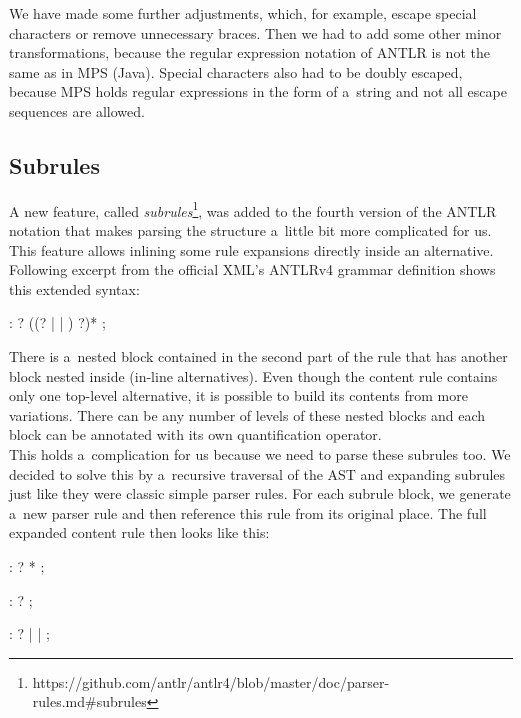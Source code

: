 We have made some further adjustments, which, for example, escape special characters or remove unnecessary braces.
Then we had to add some other minor transformations, because the regular expression notation of ANTLR is not the same as in MPS (Java).
Special characters also had to be doubly escaped, because MPS holds regular expressions in the form of a~string and not all escape sequences are allowed.

\subsection{Subrules}
\label{chap:subrules}

A new feature, called \textit{subrules}\footnote{https://github.com/antlr/antlr4/blob/master/doc/parser-rules.md\#subrules}, was added to the fourth version of the ANTLR notation that makes parsing the structure a~little bit more complicated for us.
This feature allows inlining some rule expansions directly inside an alternative.
Following excerpt from the official XML's ANTLRv4 grammar definition shows this extended syntax:

\begin{antlr}
	 :   ? ((? |  | ) ?)* ;
\end{antlr}

There is a~nested block contained in the second part of the rule that has another block nested inside (in-line alternatives).
Even though the content rule contains only one top-level alternative, it is possible to build its contents from more variations.
There can be any number of levels of these nested blocks and each block can be annotated with its own quantification operator.
\\

This holds a~complication for us because we need to parse these subrules too.
We decided to solve this by a~recursive traversal of the AST and expanding subrules just like they were classic simple parser rules.
For each subrule block, we generate a~new parser rule and then reference this rule from its original place.
The full expanded content rule then looks like this:

\begin{antlr}
	 :   ? * ;

	 :    ? ;

	 :   ?
        |   
        |   
        ;
\end{antlr}
